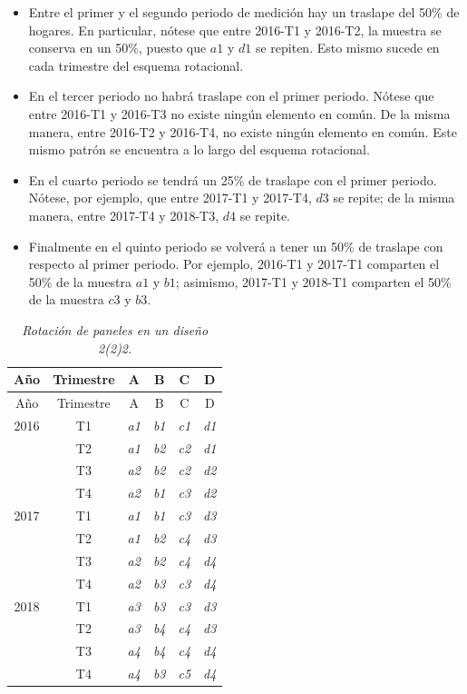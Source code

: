 \documentclass[
  10pt,
  spanish,
]{book}
\providecommand{\tightlist}{%
  \setlength{\itemsep}{0pt}\setlength{\parskip}{0pt}}
\begin{document}
\begin{itemize}
\tightlist
\item
  Entre el primer y el segundo periodo de medición hay un traslape del 50\% de hogares. En particular, nótese que entre 2016-T1 y 2016-T2, la muestra se conserva en un 50\%, puesto que \(a1\) y \(d1\) se repiten. Esto mismo sucede en cada trimestre del esquema rotacional.
\item
  En el tercer periodo no habrá traslape con el primer periodo. Nótese que entre 2016-T1 y 2016-T3 no existe ningún elemento en común. De la misma manera, entre 2016-T2 y 2016-T4, no existe ningún elemento en común. Este mismo patrón se encuentra a lo largo del esquema rotacional.
\item
  En el cuarto periodo se tendrá un 25\% de traslape con el primer periodo. Nótese, por ejemplo, que entre 2017-T1 y 2017-T4, \(d3\) se repite; de la misma manera, entre 2017-T4 y 2018-T3, \(d4\) se repite.
\item
  Finalmente en el quinto periodo se volverá a tener un 50\% de traslape con respecto al primer periodo. Por ejemplo, 2016-T1 y 2017-T1 comparten el 50\% de la muestra \(a1\) y \(b1\); asimismo, 2017-T1 y 2018-T1 comparten el 50\% de la muestra \(c3\) y \(b3\).
\end{itemize}

\begin{longtable}[]{@{}cccccc@{}}
\caption{\emph{Rotación de paneles en un diseño 2(2)2.}}\tabularnewline
\toprule
Año & Trimestre & A & B & C & D \\
\midrule
\endfirsthead
\toprule
Año & Trimestre & A & B & C & D \\
\midrule
\endhead
2016 & T1 & \emph{a1} & \emph{b1} & \emph{c1} & \emph{d1} \\
& T2 & \emph{a1} & \emph{b2} & \emph{c2} & \emph{d1} \\
& T3 & \emph{a2} & \emph{b2} & \emph{c2} & \emph{d2} \\
& T4 & \emph{a2} & \emph{b1} & \emph{c3} & \emph{d2} \\
2017 & T1 & \emph{a1} & \emph{b1} & \emph{c3} & \emph{d3} \\
& T2 & \emph{a1} & \emph{b2} & \emph{c4} & \emph{d3} \\
& T3 & \emph{a2} & \emph{b2} & \emph{c4} & \emph{d4} \\
& T4 & \emph{a2} & \emph{b3} & \emph{c3} & \emph{d4} \\
2018 & T1 & \emph{a3} & \emph{b3} & \emph{c3} & \emph{d3} \\
& T2 & \emph{a3} & \emph{b4} & \emph{c4} & \emph{d3} \\
& T3 & \emph{a4} & \emph{b4} & \emph{c4} & \emph{d4} \\
& T4 & \emph{a4} & \emph{b3} & \emph{c5} & \emph{d4} \\
\bottomrule
\end{longtable}
\end{document}
